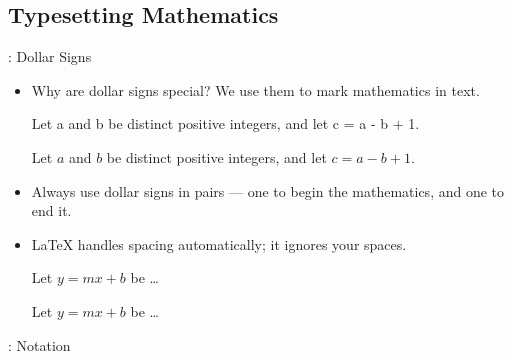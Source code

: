 \documentclass{beamer}
\begin{document}
\subsection{Typesetting Mathematics}
\begin{frame}[fragile]{\insertsubsection{}: Dollar Signs}
\begin{itemize}
\item Why are dollar signs \keystrokebftt{\$} special? We use them to mark mathematics in text.\\[1ex]
\begin{exampletwouptiny}
Let a and b be distinct positive
integers, and let c = a - b + 1.

Let $a$ and $b$ be distinct positive
integers, and let $c = a - b + 1$.
\end{exampletwouptiny}
\item Always use dollar signs in pairs --- one to begin the mathematics, and one
to end it.
\item \LaTeX{} handles spacing automatically; it ignores your spaces.
\begin{exampletwouptiny}
Let $y=mx+b$ be \ldots

Let $y = m x + b$ be \ldots
\end{exampletwouptiny}
\end{itemize}
\end{frame}

\begin{frame}[fragile]{\insertsubsection{}: Notation}
\end{frame}
\end{document}
